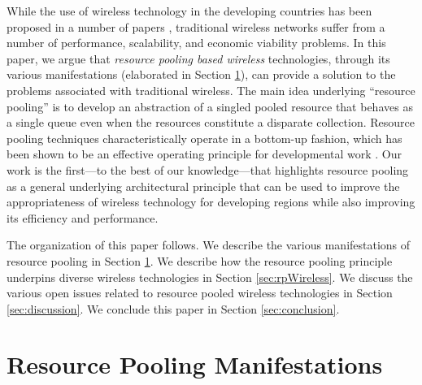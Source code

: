 \documentclass{sigcomm-alternate}
\begin{document}
While the use of wireless technology in the developing countries has been proposed in a number of papers \cite{Gunasekaran200723} \cite{subramanian2006rethinking}, traditional wireless networks suffer from a number of performance, scalability, and economic viability problems. In this paper, we argue that \textit{resource pooling based wireless} technologies, through its various manifestations (elaborated in Section \ref{sec:manifestations}), can provide a solution to the problems associated with traditional wireless. The main idea underlying ``resource pooling'' is to develop an abstraction of a singled pooled resource that behaves as a single queue even when the resources constitute a disparate collection. Resource pooling techniques characteristically operate in a bottom-up fashion, which has been shown to be an effective operating principle for  developmental work \cite{easterly2008institutions}. Our work is the first---to the best of our knowledge---that highlights resource pooling as a general underlying architectural principle that can be used to improve the appropriateness of wireless technology for developing regions while also improving its efficiency and performance. 








































The organization of this paper follows. We describe the various manifestations of resource pooling in Section \ref{sec:manifestations}. We describe how the resource pooling principle underpins diverse wireless technologies in Section \ref{sec:rpWireless}. We discuss the various open issues related to resource pooled wireless technologies in Section \ref{sec:discussion}. We conclude this paper in Section \ref{sec:conclusion}.



\section{Resource Pooling Manifestations} 
\label{sec:manifestations}
\end{document}
